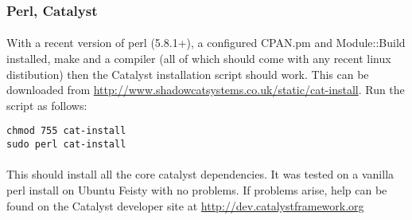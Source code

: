 % 
% 



\subsubsection{Perl, Catalyst}

\paragraph{}
With a recent version of perl (5.8.1+), a configured CPAN.pm and Module::Build installed, make and a compiler (all of which should come with any recent linux distibution) then the Catalyst installation script should work. This can be downloaded from \url{http://www.shadowcatsystems.co.uk/static/cat-install}. Run the script as follows:

\begin{verbatim}
chmod 755 cat-install
sudo perl cat-install
\end{verbatim}

\paragraph{}
This should install all the core catalyst dependencies. It was tested on a vanilla perl install on Ubuntu Feisty with no problems. If problems arise, help can be found on the Catalyst developer site at \url{http://dev.catalystframework.org}

